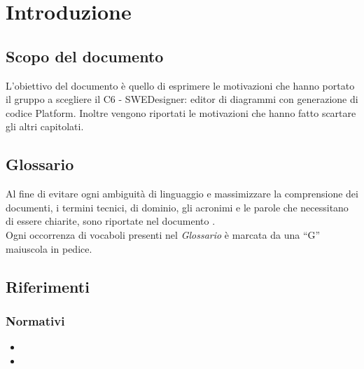 \documentclass[../StudiodiFattibilita.tex]{subfiles}
\begin{document}
	\section{Introduzione}
		\subsection{Scopo del documento}
			L'obiettivo del documento è quello di esprimere le motivazioni che hanno portato il gruppo a scegliere il  C6 - SWEDesigner: editor di diagrammi  con generazione di codice Platform.
			Inoltre vengono riportati le motivazioni che hanno fatto scartare gli altri capitolati.
		\subsection{Glossario}
			Al fine di evitare ogni ambiguità di linguaggio e massimizzare la
			comprensione dei documenti, i termini tecnici, di dominio, gli
			acronimi e le parole che necessitano di essere chiarite, sono
			riportate nel documento \glossariov.\\
			Ogni occorrenza di vocaboli presenti nel \textit{Glossario} è
			marcata da una ``G'' maiuscola in pedice.
		\subsection{Riferimenti}
			\subsubsection{Normativi}
			\begin{itemize}
				\item \normediprogettoi
				\item \glossarioi
			\end{itemize}
\end{document}
